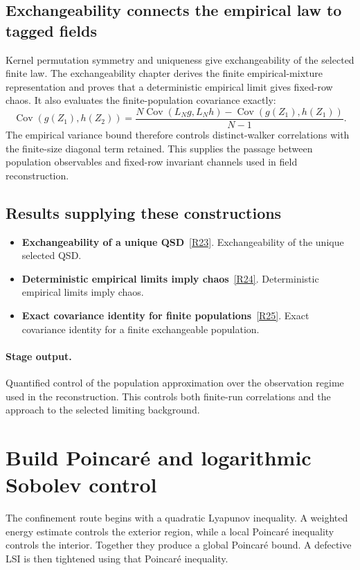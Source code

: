 \documentclass[11pt,a4paper]{article}
\begin{document}
\subsection*{Exchangeability connects the empirical law to tagged fields}
Kernel permutation symmetry and uniqueness give exchangeability of the selected finite law. The exchangeability chapter derives the finite empirical-mixture representation and proves that a deterministic empirical limit gives fixed-row chaos. It also evaluates the finite-population covariance exactly:
\[
\operatorname{Cov}(g(Z_1),h(Z_2))
=\frac{N\operatorname{Cov}(L_Ng,L_Nh)
-\operatorname{Cov}(g(Z_1),h(Z_1))}{N-1}.
\]
The empirical variance bound therefore controls distinct-walker correlations with the finite-size diagonal term retained. This supplies the passage between population observables and fixed-row invariant channels used in field reconstruction.
\subsection*{Results supplying these constructions}
\begin{itemize}
\item \textbf{Exchangeability of a unique QSD}~\hyperref[src:thm-qsd-exchangeability]{[R23]}. Exchangeability of the unique selected QSD.
\item \textbf{Deterministic empirical limits imply chaos}~\hyperref[src:thm-propagation-chaos-qsd]{[R24]}. Deterministic empirical limits imply chaos.
\item \textbf{Exact covariance identity for finite populations}~\hyperref[src:thm-correlation-decay]{[R25]}. Exact covariance identity for a finite exchangeable population.
\end{itemize}
\paragraph{Stage output.} Quantified control of the population approximation over the observation regime used in the reconstruction. This controls both finite-run correlations and the approach to the selected limiting background.

\section{Build Poincar\'e and logarithmic Sobolev control}
\label{stage:7}
The confinement route begins with a quadratic Lyapunov inequality. A weighted energy estimate controls the exterior region, while a local Poincar\'e inequality controls the interior. Together they produce a global Poincar\'e bound. A defective LSI is then tightened using that Poincar\'e inequality.
\end{document}
